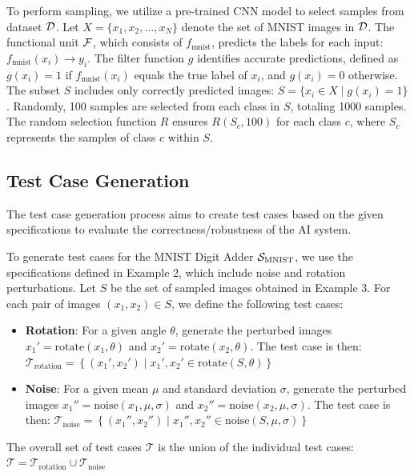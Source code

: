 \documentclass[10pt, conference, a4paper, final]{IEEEtran}
\begin{document}
\begin{example}
    To perform sampling, we utilize a pre-trained CNN model to select samples from dataset $\D$. Let $X = \{x_1, x_2, \dots, x_N\}$ denote the set of MNIST images in $\D$. The functional unit $\F$, which consists of $f_{\text{mnist}}$, predicts the labels for each input: $f_{\text{mnist}}(x_i) \rightarrow y_i$. The filter function $g$ identifies accurate predictions, defined as $g(x_i) = 1$ if $f_{\text{mnist}}(x_i)$ equals the true label of $x_i$, and $g(x_i) = 0$ otherwise. The subset $S$ includes only correctly predicted images: $S = \{x_i \in X \mid g(x_i) = 1\}$. Randomly, 100 samples are selected from each class in $S$, totaling 1000 samples. The random selection function $R$ ensures $R(S_c, 100)$ for each class $c$, where $S_c$ represents the samples of class $c$ within $S$.
  \end{example} 
  \subsection{Test Case Generation}
  The test case generation process aims to create test cases based on the given specifications to evaluate the correctness/robustness of the AI system.
  \begin{example}
    To generate test cases for the MNIST Digit Adder $\S_{\text{MNIST}}$, we use the specifications defined in Example 2, which include noise and rotation perturbations. Let $S$ be the set of sampled images obtained in Example 3. For each pair of images $(x_1, x_2) \in S$, we define the following test cases:
    \begin{itemize}
        \item \textbf{Rotation}: For a given angle $\theta$, generate the perturbed images $x_1' = \text{rotate}(x_1, \theta)$ and $x_2' = \text{rotate}(x_2, \theta)$. The test case is then:
        $\mathcal{T}_{\text{rotation}} = \left\{(x_1', x_2') \mid x_1', x_2' \in \text{rotate}(S, \theta)\right\}$
        \item \textbf{Noise}: For a given mean $\mu$ and standard deviation $\sigma$, generate the perturbed images $x_1'' = \text{noise}(x_1, \mu, \sigma)$ and $x_2'' = \text{noise}(x_2, \mu, \sigma)$. The test case is then:
        $\mathcal{T}_{\text{noise}} = \left\{(x_1'', x_2'') \mid x_1'', x_2'' \in \text{noise}(S, \mu, \sigma)\right\}$
    \end{itemize}
    The overall set of test cases $\mathcal{T}$ is the union of the individual test cases:
    $\mathcal{T} = \mathcal{T}_{\text{rotation}} \cup \mathcal{T}_{\text{noise}}$
   
\end{example}
\end{document}
